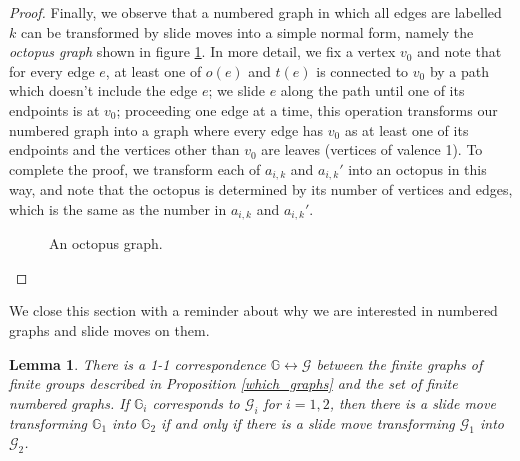 \documentclass[11pt, a4 paper]{amsart}
\numberwithin{equation}{section}
\newtheorem{lemma}[theorem]{Lemma}
\theoremstyle{remark}
\theoremstyle{definition}
\def\GG{\mathbb{G}}
\def\mc{\mathcal}
\begin{document}
\begin{proof}
	Finally, we observe that a numbered graph in which all edges are labelled $k$ can be transformed by slide moves
	into a  simple  normal form, namely the {\em octopus graph} shown in figure \ref{fig:octopus}. 
	In more detail,  we fix a vertex $v_0$ and note that for
	every edge $e$, at least one of $o(e)$ and $t(e)$
	is connected to $v_0$ by a path which doesn't include the edge $e$;
	we  slide $e$ along the path until one of its endpoints is at $v_0$; proceeding one edge at a time, this
	operation transforms our numbered graph into a graph where  every edge has $v_0$
	as at least one of its endpoints and the vertices other than $v_0$ are leaves (vertices of valence 1). 
	To complete the proof, we  transform each of $a_{i, k}$ and $a_{i, k}'$ into an octopus in this way, 
	and note  that the octopus is determined by its  number of vertices and edges, which is the same as the
	number in $a_{i, k}$ and $a_{i, k}'$.
	\begin{figure}
		\begin{center}
		\end{center}
		\caption{An octopus graph.}
		\label{fig:octopus}
	\end{figure}
\end{proof}

We close this section with a reminder about why we are interested in numbered graphs and slide moves on them.

\begin{lemma}\label{l:sliding-the-same}
	There is a 1-1 correspondence  $\GG \leftrightarrow \mc{G}$
	between the finite graphs of finite groups described in Proposition \ref{which_graphs} and
	the set of finite numbered graphs. If $\GG_i$ corresponds to $\mc{G}_i$ for $i=1,2$, then
	there is a slide move transforming $\GG_1$ into $\GG_2$ if and only if there is a slide move
	transforming $\mc{G}_1$ into $\mc{G}_2$.
\end{lemma}
\end{document}
